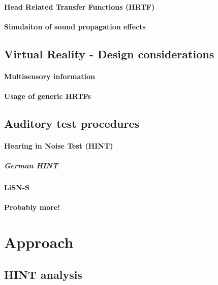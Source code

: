 \documentclass[a4paper,11pt]{article}%
\renewcommand{\\}{\vspace*{0.5\baselineskip} \newline}
\begin{document}
\paragraph{Head Related Transfer Functions (HRTF)}

\paragraph{Simulaiton of sound propagation effects}

\subsection{Virtual Reality - Design considerations}

\paragraph{Multisensory information}

\paragraph{Usage of generic \acs{HRTF}s}
	
\subsection{Auditory test procedures}

\paragraph{Hearing in Noise Test (HINT)}

\subparagraph{German HINT}

\paragraph{LiSN-S}

\paragraph{Probably more!}


\section{Approach}

\subsection{HINT analysis}
\end{document}
